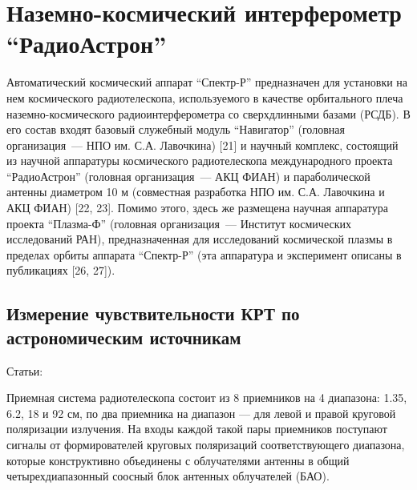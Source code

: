 \chapter{Наземно-космический интерферометр ``РадиоАстрон''} \label{chapt2}


Автоматический космический аппарат ``Спектр-Р'' предназначен для установки на нем космического
радиотелескопа, используемого в качестве орбитального плеча наземно-космического
радиоинтерферометра со сверхдлинными базами (РСДБ). В его состав входят базовый служебный модуль
``Навигатор'' (головная организация~--- НПО им. С.А. Лавочкина) [21] и научный комплекс, состоящий
из научной аппаратуры космического радиотелескопа международного проекта ``РадиоАстрон'' (головная
организация~--- АКЦ ФИАН) и параболической антенны диаметром 10 м (совместная разработка НПО им.
С.А. Лавочкина и АКЦ ФИАН) [22, 23]. Помимо этого, здесь же размещена научная аппаратура проекта
``Плазма-Ф'' (головная организация~--- Институт космических исследований РАН), предназначенная для
исследований космической плазмы в пределах орбиты аппарата ``Спектр-Р'' (эта аппаратура и
эксперимент описаны в публикациях [26, 27]).


\section{Измерение чувствительности КРТ по астрономическим источникам}

Статьи: \cite{Kardashev_2013_rus, Kovalev_2014_rus}

Приемная система радиотелескопа состоит из 8
приемников на 4 диапазона: 1.35, 6.2, 18 и 92 см,
по два приемника на диапазон --- для левой и правой круговой поляризации излучения. На входы
каждой такой пары приемников поступают сигналы
от формирователей круговых поляризаций соответствующего диапазона, которые конструктивно
объединены с облучателями антенны в общий четырехдиапазонный соосный блок антенных облучателей
(БАО).


